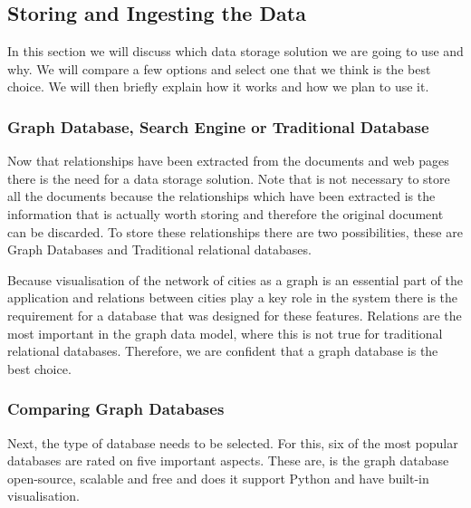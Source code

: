 \subsection{Storing and Ingesting the Data}
In this section we will discuss which data storage solution we are going to use and why. We will compare a few options and select one that we think is the best choice. We will then briefly explain how it works and how we plan to use it.

\subsubsection{Graph Database, Search Engine or Traditional Database}
Now that relationships have been extracted from the documents and web pages there is the need for a data storage solution. Note that is not necessary to store all the documents because the relationships which have been extracted is the information that is actually worth storing and therefore the original document can be discarded. To store these relationships there are two possibilities, these are Graph Databases and Traditional relational databases.


Because visualisation of the network of cities as a graph is an essential part of the application and relations between cities play a key role in the system there is the requirement for a database that was designed for these features. Relations are the most important in the graph data model, where this is not true for traditional relational databases. Therefore, we are confident that a graph database is the best choice.

\subsubsection{Comparing Graph Databases}
Next, the type of database needs to be selected. For this, six of the most popular databases are rated on five important aspects. These are, is the graph database open-source, scalable and free and does it support Python and have built-in visualisation.\\


